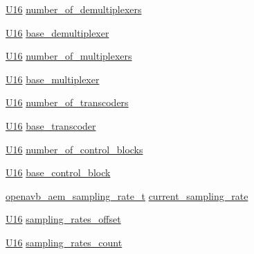 \begin{DoxyCompactItemize}
\item 
\hyperlink{openavb__types__base__pub_8h_a0a0a322d5fa4a546d293a77ba8b4a71f}{U16} \hyperlink{structopenavb__aem__descriptor__audio__unit__t_aa45379039726b666c03190124a509ce9}{number\+\_\+of\+\_\+demultiplexers}
\item 
\hyperlink{openavb__types__base__pub_8h_a0a0a322d5fa4a546d293a77ba8b4a71f}{U16} \hyperlink{structopenavb__aem__descriptor__audio__unit__t_abf7fca136bc0a4d6c86dc16601a5ba15}{base\+\_\+demultiplexer}
\item 
\hyperlink{openavb__types__base__pub_8h_a0a0a322d5fa4a546d293a77ba8b4a71f}{U16} \hyperlink{structopenavb__aem__descriptor__audio__unit__t_a6dfacf2a40299be221433bd1facbaafe}{number\+\_\+of\+\_\+multiplexers}
\item 
\hyperlink{openavb__types__base__pub_8h_a0a0a322d5fa4a546d293a77ba8b4a71f}{U16} \hyperlink{structopenavb__aem__descriptor__audio__unit__t_a4dfa22925c6dc4f0b13763242badebc5}{base\+\_\+multiplexer}
\item 
\hyperlink{openavb__types__base__pub_8h_a0a0a322d5fa4a546d293a77ba8b4a71f}{U16} \hyperlink{structopenavb__aem__descriptor__audio__unit__t_a924b65c5411105ebd71dcefccce23be7}{number\+\_\+of\+\_\+transcoders}
\item 
\hyperlink{openavb__types__base__pub_8h_a0a0a322d5fa4a546d293a77ba8b4a71f}{U16} \hyperlink{structopenavb__aem__descriptor__audio__unit__t_a7cf3378163dcc76a0d6c9c081f338dc5}{base\+\_\+transcoder}
\item 
\hyperlink{openavb__types__base__pub_8h_a0a0a322d5fa4a546d293a77ba8b4a71f}{U16} \hyperlink{structopenavb__aem__descriptor__audio__unit__t_adc6b7b45b09f818075afb2cfd332339c}{number\+\_\+of\+\_\+control\+\_\+blocks}
\item 
\hyperlink{openavb__types__base__pub_8h_a0a0a322d5fa4a546d293a77ba8b4a71f}{U16} \hyperlink{structopenavb__aem__descriptor__audio__unit__t_a446a9963a0212c888c0d44eec1b1f0cc}{base\+\_\+control\+\_\+block}
\item 
\hyperlink{structopenavb__aem__sampling__rate__t}{openavb\+\_\+aem\+\_\+sampling\+\_\+rate\+\_\+t} \hyperlink{structopenavb__aem__descriptor__audio__unit__t_ad9ca5278750b4db6bc7d9f15ae9bf9c4}{current\+\_\+sampling\+\_\+rate}
\item 
\hyperlink{openavb__types__base__pub_8h_a0a0a322d5fa4a546d293a77ba8b4a71f}{U16} \hyperlink{structopenavb__aem__descriptor__audio__unit__t_a7359eabb4872379de15e9e771f7f9881}{sampling\+\_\+rates\+\_\+offset}
\item 
\hyperlink{openavb__types__base__pub_8h_a0a0a322d5fa4a546d293a77ba8b4a71f}{U16} \hyperlink{structopenavb__aem__descriptor__audio__unit__t_a75b9a3bf65c881bc71b05d983793aa62}{sampling\+\_\+rates\+\_\+count}

\end{DoxyCompactItemize}
